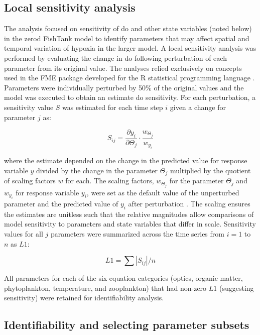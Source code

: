 \documentclass[letterpaper,12pt,oneside]{article}\usepackage[]{graphicx}\usepackage[]{color}
\begin{document}
\subsection{Local sensitivity analysis}

The analysis focused on sensitivity of \ac{do} and other state variables (noted below) in the \ac{zerod} FishTank model to identify parameters that may affect spatial and temporal variation of hypoxia in the larger model.  A local sensitivity analysis was performed by evaluating the change in \ac{do} following perturbation of each parameter from its original value.  The analyses relied exclusively on concepts used in the FME package developed for the R statistical programming language \citep{Soetaert10,RDCT16}. Parameters were individually perturbed by 50\% of the original values and the model was executed to obtain an estimate \ac{do} sensitivity.  For each perturbation, a sensitivity value $S$ was estimated for each time step $i$ given a change for parameter $j$ as:

\begin{equation} \label{sijeqn}
S_{ij} = \frac{\partial y_i}{\partial \Theta_j}\cdot\frac{w_{\Theta_j}}{w_{y_i}}
\end{equation}

\noindent where the estimate depended on the change in the predicted value for response variable $y$ divided by the change in the parameter $\Theta_j$ multiplied by the quotient of scaling factors $w$ for each.  The scaling factors, $w_{\Theta_j}$ for the parameter $\Theta_j$ and $w_{y_i}$ for response variable $y_i$, were set as the default value of the unperturbed parameter and the predicted value of $y_i$ after perturbation \citep{Soetaert10}.  The scaling ensures the estimates are unitless such that the relative magnitudes allow comparisons of model sensitivity to parameters and state variables that differ in scale.  Sensitivity values for all $j$ parameters were summarized across the time series from $i = 1$ to $n$ as $L1$:

\begin{equation} \label{l1}
L1 = \sum|S_{ij}|/n
\end{equation}

All parameters for each of the six equation categories (optics, organic matter, phytoplankton, temperature, and zooplankton) that had non-zero $L1$ (suggesting sensitivity) were retained for identifiability analysis.  

\subsection{Identifiability and selecting parameter subsets}
\end{document}
